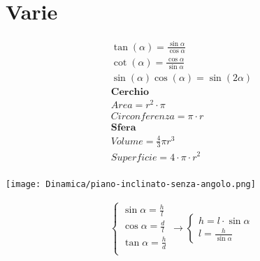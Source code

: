 \section{Varie} 

\begin{gather*}
    \tan (\alpha) = \frac{\sin \alpha}{\cos \alpha} \\
    \cot (\alpha) = \frac{\cos \alpha}{\sin \alpha} \\
    \sin (\alpha) \cos (\alpha) = \sin (2 \alpha) \\
    \textbf{Cerchio} \\
        Area = r^2 \cdot \pi \\
        Circonferenza = \pi \cdot r \\
    \textbf{Sfera} \\
        Volume = \frac{4}{3} \pi r^3 \\
        Superficie = 4 \cdot \pi \cdot r^2 \\
\end{gather*}

\begin{center}
    \texttt{[image: Dinamica/piano-inclinato-senza-angolo.png]} \\    
\end{center}

\begin{gather*}
    \begin{cases}
        \sin \alpha = \frac{h}{l} \\ 
        \cos \alpha = \frac{d}{l} \\
        \tan \alpha = \frac{h}{d} \\
    \end{cases} \rightarrow 
    \begin{cases}
        h = l \cdot \sin \alpha \\
        l = \frac{h}{\sin \alpha}
    \end{cases} \\
\end{gather*}
